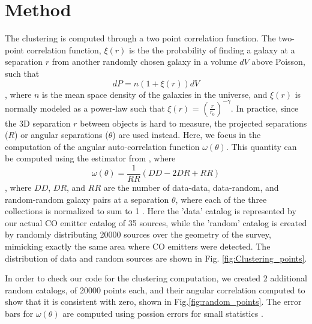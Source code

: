 \section{Method}


The clustering is computed through a two point correlation function. The two-point correlation function, $ \xi(r)$ is the the probability of finding a galaxy at a separation $r$ from another randomly chosen galaxy in a volume $dV$ above Poisson, such that $$ dP = n(1 + \xi(r))dV $$, where $n$ is the mean space density of the galaxies in the universe\cite{hickox2011clustering}, and $\xi(r)$ is normally modeled as a power-law such that $\xi(r)$ = $(\frac{r}{r_0})^{-\gamma}$. In practice, since the 3D separation $r$ between objects is hard to measure, the projected separations ($R$) or angular separations ($\theta$) are used instead. Here, we focus in the computation of the angular auto-correlation function $\omega(\theta)$. This quantity can be computed using the estimator from \cite{1993ApJ...412...64L}, where $$ \omega(\theta) = \frac{1}{RR}(DD-2DR + RR)$$, where $DD$, $DR$, and $RR$ are the number of data-data, data-random, and random-random galaxy pairs at a separation $\theta$, where each of the three collections is normalized to sum to 1 \cite{hickox2011clustering}. Here the 'data' catalog is represented by our actual CO emitter catalog of 35 sources, while the 'random' catalog is created by randomly distributing 20000 sources over the geometry of the survey, mimicking exactly the same area where CO emitters were detected. The distribution of data and random sources are shown in Fig. \ref{fig:Clustering_points}.



In order to check our code for the clustering computation, we created 2 additional random catalogs, of 20000 points each, and their angular correlation computed to show that it is consistent with zero, shown in Fig.\ref{fig:random_points}. The error bars for $\omega(\theta)$ are computed using possion errors for small statistics \cite{1986ApJ...303..336G}.

